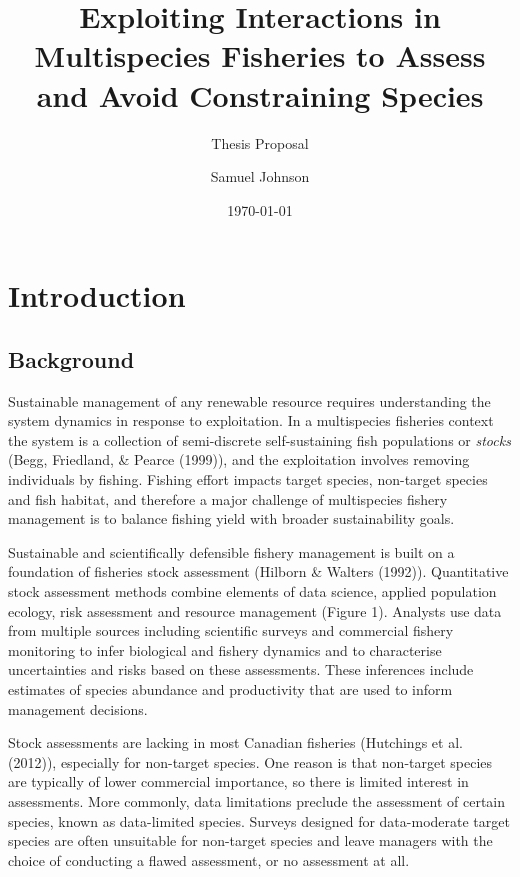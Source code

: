 \documentclass[12pt,]{scrartcl}
\title{Exploiting Interactions in Multispecies Fisheries to Assess and Avoid
Constraining Species}
\subtitle{Thesis Proposal}
\author{Samuel Johnson}
\date{\today}
\begin{document}
\maketitle





\newpage

{
\hypersetup{linkcolor=black}
\setcounter{tocdepth}{3}
\tableofcontents
}
\section{Introduction}\label{introduction}

\subsection{Background}\label{background}

Sustainable management of any renewable resource requires understanding
the system dynamics in response to exploitation. In a multispecies
fisheries context the system is a collection of semi-discrete
self-sustaining fish populations or \emph{stocks} (Begg, Friedland, \&
Pearce (1999)), and the exploitation involves removing individuals by
fishing. Fishing effort impacts target species, non-target species and
fish habitat, and therefore a major challenge of multispecies fishery
management is to balance fishing yield with broader sustainability
goals.

Sustainable and scientifically defensible fishery management is built on
a foundation of fisheries stock assessment (Hilborn \& Walters (1992)).
Quantitative stock assessment methods combine elements of data science,
applied population ecology, risk assessment and resource management
(Figure 1). Analysts use data from multiple sources including scientific
surveys and commercial fishery monitoring to infer biological and
fishery dynamics and to characterise uncertainties and risks based on
these assessments. These inferences include estimates of species
abundance and productivity that are used to inform management decisions.

Stock assessments are lacking in most Canadian fisheries (Hutchings et
al. (2012)), especially for non-target species. One reason is that
non-target species are typically of lower commercial importance, so
there is limited interest in assessments. More commonly, data
limitations preclude the assessment of certain species, known as
data-limited species. Surveys designed for data-moderate target species
are often unsuitable for non-target species and leave managers with the
choice of conducting a flawed assessment, or no assessment at all.
\end{document}
